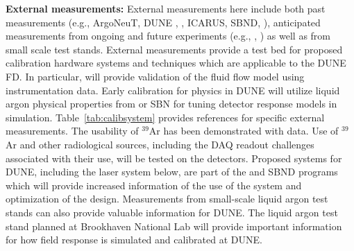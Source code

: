 \textbf{External measurements:} External measurements here include both past measurements (e.g., ArgoNeuT, DUNE , , ICARUS, SBND, \lariat), anticipated measurements from ongoing and future experiments (e.g., , ) as well as from small scale  test stands. External measurements provide a test bed for proposed calibration hardware systems and techniques which are applicable to the DUNE FD. In particular,  will provide validation of the fluid flow model using instrumentation data. Early calibration for physics in DUNE will utilize liquid argon physical properties from  or SBN  for tuning detector response models in simulation. Table~\ref{tab:calibsystem} provides  references for specific external measurements. The usability of ${}^{39}$Ar has been demonstrated with \microboone data. %
Use of  ${}^{39}$Ar  and other radiological sources, including the DAQ readout challenges associated with their use, will be tested on the    detectors. Proposed systems for DUNE, including the laser system below, are part of the \microboone and SBND programs which will provide increased information of the use of the system and optimization of the design. Measurements from small-scale liquid argon test stands can also provide valuable information for DUNE. The liquid argon test stand planned at Brookhaven National Lab will provide important information for how field response is simulated and calibrated at DUNE.





